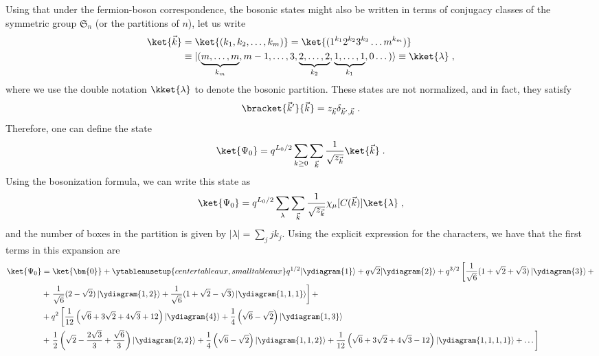 Using that under the fermion-boson correspondence, the bosonic states might also be
written in terms of conjugacy classes of the symmetric group
\(\mathfrak{S}_n\) (or the partitions of \(n\)), let us write 
\begin{equation}
  \label{eq:bos:states}
  \begin{split}
    \ket{\vec{k}}  & = \ket{(k_1, k_2, \dots, k_m)}  
    = \ket{(1^{k_1} 2^{k_2} 3^{k_3}\dots m^{k_m})} \\
    & \equiv | (\underbrace{m, \dots, m}_{k_m},m-1, \dots ,3, \underbrace{2, \dots, 2}_{k_2},
  \underbrace{1, \dots, 1}_{k_1}, 0\dots)\rangle \equiv
  \kket{\lambda}\; ,
  \end{split}
\end{equation}
where we use the double notation \(\kket{\lambda}\) to denote the bosonic partition. 
These states are not normalized, and in fact, they satisfy
\begin{equation}
\bracket{\vec{k}'}{\vec{k}} = z_{\vec{k}} \delta_{\vec{k}', \vec{k}}\; .
\end{equation}
Therefore, one can define the state
\begin{equation}
\ket{\Psi_0} = q^{L_0/2} \sum_{k\geq 0} \sum_{\vec{k}} \frac{1}{\sqrt{z_{\vec{k}}}} \ket{\vec{k}}\; . 
\end{equation}
Using the bosonization formula, we can write this state as
\begin{equation}
  \ket{\Psi_0} = q^{L_0/2} \sum_{\lambda} \sum_{\vec{k}}
  \frac{1}{\sqrt{z_{\vec{k}}}} \chi_\mu[C(\vec{k})] \ket{\lambda}\; ,
\end{equation}
and the number of boxes in the partition is given by \(|\lambda| = \sum_j j k_j\).
Using the explicit expression for the characters, we have that the
first terms in this expansion are
\begin{equation}
  \begin{split}
\ket{\Psi_0} & = \ket{\bm{0}} + 
\ytableausetup{centertableaux, smalltableaux}
q^{1/2} |\ydiagram{1} \rangle +
q \sqrt{2} |\ydiagram{2} \rangle+ 
q^{3/2} \left[ \frac{1}{\sqrt{6}} (1 + \sqrt{2} + \sqrt{3})\left| \ydiagram{3} \right\rangle + \right. \\
& + \left. \frac{1}{\sqrt{6}} (2 - \sqrt{2}) \left| \ydiagram{1,2} \right\rangle+
 \frac{1}{\sqrt{6}} (1 + \sqrt{2} - \sqrt{3})\left| \ydiagram{1,1,1} \right\rangle\right] + \\
& + q^2 \left[ \frac{1}{12}\left( \sqrt{6} + 3 \sqrt{2} + 4 \sqrt{3}
  + 12\right) \left| \ydiagram{4} \right\rangle 
  + \frac{1}{4}\left( \sqrt{6} - \sqrt{2} \right)\left| \ydiagram{1,3} \right\rangle \right.\\
  & + \left. \frac{1}{2}\left( \sqrt{2} - \frac{2\sqrt{3}}{3} + \frac{\sqrt{6}}{3} \right)
  \left| \ydiagram{2,2} \right\rangle + 
  \frac{1}{4}\left( \sqrt{6} - \sqrt{2} \right) \left| \ydiagram{1,1,2} \right\rangle + 
  \frac{1}{12}\left( \sqrt{6} + 3 \sqrt{2} + 4 \sqrt{3}
  - 12\right) \left| \ydiagram{1,1,1,1} \right\rangle + \dots
  \right]
  \end{split}
\end{equation}

